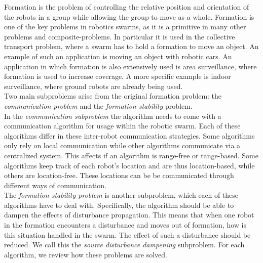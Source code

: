 
Formation is the problem of controlling the relative position and orientation of the robots in a group while allowing the group to move as a whole. \cite{consolini2008leader}
Formation is one of the key problems in robotics swarms, as it is a primitive in many other problems and composite-problems.
In particular it is used in the collective transport problem, where a swarm has to hold a formation to move an object.
An example of such an application is moving an object with robotic cars. \cite{mas2012object}
An application in which formation is also extensively used is area surveillance, where formation is used to increase coverage. \cite{burkle2011towards}
A more specific example is indoor surveillance, where ground robots are already being used. \cite{di2010autonomous, rybski2000team}
\\

Two main subproblems arise from the original formation problem: the \emph{communication problem} and the \emph{formation stability} problem.\\
In the \emph{communication subproblem} the algorithm needs to come with a communication algorithm for usage within the robotic swarm.
Each of these algorithms differ in these inter-robot communication strategies.
Some algorithms only rely on local communication while other algorithms communicate via a centralized system.
This affects if an algorithm is range-free or range-based.
Some algorithms keep track of each robot's location and are thus location-based, while others are location-free.
These locations can be be communicated through different ways of communication. \\

The \emph{formation stability problem} is another subproblem, which each of these algorithms have to deal with.
Specifically, the algorithm should be able to dampen the effects of disturbance propagation.
This means that when one robot in the formation encounters a disturbance and moves out of formation, how is this situation handled in the swarm.
The effect of such a disturbance should be reduced.
We call this the \emph{source disturbance dampening} subproblem.
For each algorithm, we review how these problems are solved.

